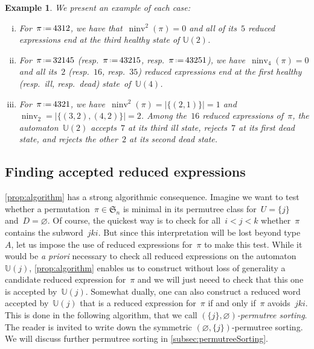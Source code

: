\documentclass{amsart}
\newtheorem{example}[theorem]{Example}
\newcommand{\fS}{\mathfrak{S}} %
\newcommand{\eqdef}{\mbox{\,\raisebox{0.2ex}{\scriptsize\ensuremath{\mathrm:}}\ensuremath{=}\,}} %
\newcommand{\defn}[1]{\textsl{\color{darkblue} #1}} %
\newcommand{\apriori}{\textit{a priori}} %
\DeclareMathOperator{\ninv}{ninv} %
\newcommand{\automatonU}{\mathbb{U}} %
\begin{document}
\begin{example}\label{exm:sameStateAcceptedReducedExpressionsRefined}
We present an example of each case:
\begin{enumerate}[(i)]
	\item For~$\pi \eqdef 4312$, we have that~$\ninv^2(\pi)=0$ and all of its~$5$ reduced expressions end at the third healthy state of $\automatonU(2)$.
	\item For~$\pi \eqdef 32145$ (resp.~$\pi \eqdef 43215$, resp.~$\pi \eqdef 43251$), we have~$\ninv_4(\pi) = 0$ and all its~$2$ (resp.~$16$, resp.~$35$) reduced expressions end at the first healthy (resp.~ill, resp.~dead) state~of~$\automatonU(4)$.
	\item For~$\pi \eqdef 4321$, we have~$\ninv^2(\pi) = |\{(2,1)\}| = 1$ and $\ninv_2 = |\{(3,2),(4,2)\}| = 2$. Among the~$16$ reduced expressions of~$\pi$, the automaton~$\automatonU(2)$ accepts~$7$ at its third ill state, rejects~$7$ at its first dead state, and rejects the other~$2$ at its second dead state.
\end{enumerate}
\end{example}

\subsection{Finding accepted reduced expressions}

\cref{prop:algorithm} has a strong algorithmic consequence.
Imagine we want to test whether a permutation~$\pi \in \fS_n$ is minimal in its permutree class for~$U = \{j\}$ and~$D = \varnothing$.
Of course, the quickest way is to check for all~$i < j < k$ whether~$\pi$ contains the subword~$jki$.
But since this interpretation will be lost beyond type~$A$, let us impose the use of reduced expressions for~$\pi$ to make this test.
While it would be \apriori{} necessary to check all reduced expressions on the automaton~$\automatonU(j)$, \cref{prop:algorithm} enables us to construct without loss of generality a candidate reduced expression for~$\pi$ and we will just neeed to check that this one is accepted by~$\automatonU(j)$.
Somewhat dually, one can also construct a reduced word accepted by~$\automatonU(j)$ that is a reduced expression for~$\pi$ if and only if~$\pi$ avoids~$jki$.
This is done in the following algorithm, that we call \defn{$(\{j\}, \varnothing)$-permutree sorting}.
The reader is invited to write down the symmetric $(\varnothing, \{j\})$-permutree sorting.
We will discuss further permutree sorting in \cref{subsec:permutreeSorting}.
\end{document}

